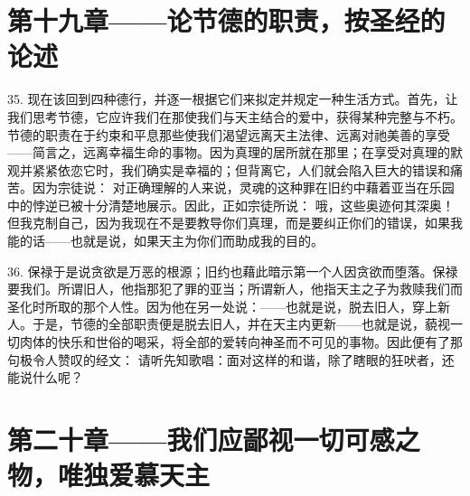 
\section{第十九章——论节德的职责，按圣经的论述}

35. 现在该回到四种德行，并逐一根据它们来拟定并规定一种生活方式。首先，让我们思考节德，它应许我们在那使我们与天主结合的爱中，获得某种完整与不朽。节德的职责在于约束和平息那些使我们渴望远离天主法律、远离对祂美善的享受——简言之，远离幸福生命的事物。因为真理的居所就在那里；在享受对真理的默观并紧紧依恋它时，我们确实是幸福的；但背离它，人们就会陷入巨大的错误和痛苦。因为宗徒说： 对正确理解的人来说，灵魂的这种罪在旧约中藉着亚当在乐园中的悖逆已被十分清楚地展示。因此，正如宗徒所说： 哦，这些奥迹何其深奥！但我克制自己，因为我现在不是要教导你们真理，而是要纠正你们的错误，如果我能的话——也就是说，如果天主为你们而助成我的目的。\par

36. 保禄于是说贪欲是万恶的根源；旧约也藉此暗示第一个人因贪欲而堕落。保禄要我们。所谓旧人，他指那犯了罪的亚当；所谓新人，他指天主之子为救赎我们而圣化时所取的那个人性。因为他在另一处说：——也就是说，脱去旧人，穿上新人。于是，节德的全部职责便是脱去旧人，并在天主内更新——也就是说，藐视一切肉体的快乐和世俗的喝采，将全部的爱转向神圣而不可见的事物。因此便有了那句极令人赞叹的经文： 请听先知歌唱：面对这样的和谐，除了瞎眼的狂吠者，还能说什么呢？\par


\section{第二十章——我们应鄙视一切可感之物，唯独爱慕天主}


